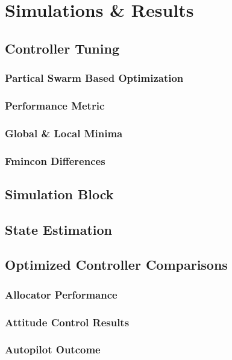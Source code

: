 \chapter{Simulations \& Results}
\label{ch:simulation}
\section{Controller Tuning}
\label{sec:simulation.tuning}
\subsection{Partical Swarm Based Optimization}
\label{subsec:simulation.tuning.pso}
\subsection{Performance Metric}
\label{subsec:simulation.tuning.metric}
\subsection{Global \& Local Minima}
\subsection{Fmincon Differences}

\section{Simulation Block}
\label{sec:simulation.block}
\section{State Estimation}
\label{sec:state}
\section{Optimized Controller Comparisons}
\label{sec:simulation.comparison}
\subsection{Allocator Performance}
\subsection{Attitude Control Results}
\subsection{Autopilot Outcome}
